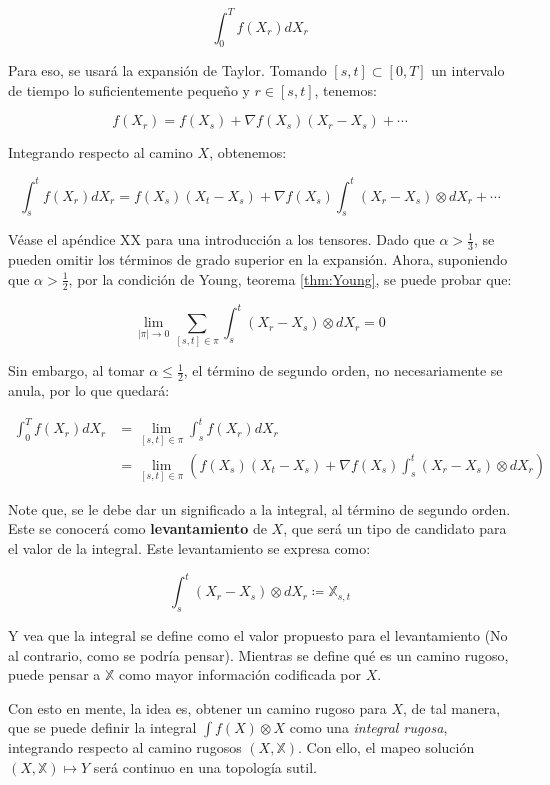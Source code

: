 \[
	\int_0^T f(X_r) dX_r
\]

Para eso, se usará la expansión de Taylor. Tomando $[s,t] \subset [0, T]$ un intervalo de tiempo lo suficientemente pequeño y $r \in [s,t]$, tenemos:

\[
	f(X_r) = f(X_s) + \nabla f(X_s) (X_r - X_s) + \cdots
\]

Integrando respecto al camino $X$, obtenemos:

\[
	\int_s^t f(X_r) dX_r = f(X_s) (X_t - X_s) + \nabla f(X_s) \int_s^t (X_r - X_s) \otimes dX_r + \cdots
\]

Véase el apéndice XX para una introducción a los tensores. Dado que $\alpha > \frac{1}{3}$, se pueden omitir los términos de grado superior en la expansión. Ahora, suponiendo que $\alpha > \frac{1}{2}$, por la condición de Young, teorema \ref{thm:Young}, se puede probar que:

\[
	\lim_{ \lvert \pi \rvert \rightarrow 0 } \sum_{ [s,t]\in\pi } \int_s^t (X_r - X_s) \otimes dX_r = 0
\]

Sin embargo, al tomar $\alpha \leq \frac{1}{2}$, el término de segundo orden, no necesariamente se anula, por lo que quedará:

\begin{align*}
	\int_0^T f(X_r) dX_r &= \lim_{ [s,t] \in \pi } \int_s^t f(X_r) dX_r \\
	&= \lim_{ [s,t] \in \pi } \left(  f(X_s) (X_t - X_s) + \nabla f(X_s) \int_s^t (X_r - X_s) \otimes dX_r  \right)
\end{align*}


Note que, se le debe dar un significado a la integral, al término de segundo orden. Este se conocerá como \textbf{levantamiento} de $X$, que será un tipo de candidato para el valor de la integral. Este levantamiento se expresa como:

\[
	\int_s^t (X_r - X_s) \otimes dX_r \coloneqq \mathbb{X}_{s,t} 
\]

Y vea que la integral se define como el valor propuesto para el levantamiento (No al contrario, como se podría pensar). Mientras se define qué es un camino rugoso, puede pensar a $\mathbb{X}$ como mayor información codificada por $X$.

Con esto en mente, la idea es, obtener un camino rugoso para $X$, de tal manera, que se puede definir la integral $\int f(X) \otimes X$ como una \textit{integral rugosa}, integrando respecto al camino rugosos $(X, \mathbb{X})$. Con ello, el mapeo solución $(X, \mathbb{X}) \mapsto Y$ será continuo en una topología sutil.

